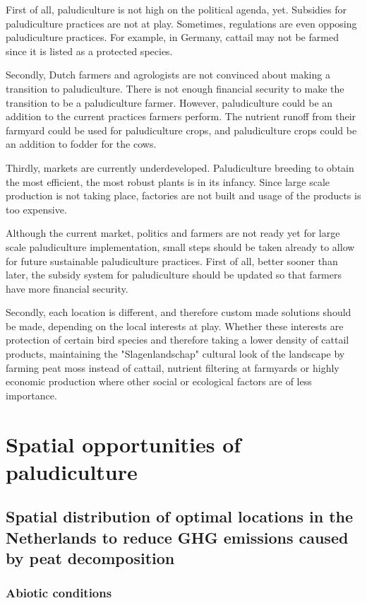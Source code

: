{First of all, paludiculture is not high on the political agenda, yet. Subsidies for paludiculture practices are not at play. Sometimes, regulations are even opposing paludiculture practices. For example, in Germany, cattail may not be farmed since it is listed as a protected species. 

Secondly, Dutch farmers and agrologists are not convinced about making a transition to paludiculture. There is not enough financial security to make the transition to be a paludiculture farmer. However, paludiculture could be an addition to the current practices farmers perform. The nutrient runoff from their farmyard could be used for paludiculture crops, and paludiculture crops could be an addition to fodder for the cows. 

Thirdly, markets are currently underdeveloped. Paludiculture breeding to obtain the most efficient, the most robust plants is in its infancy. Since large scale production is not taking place, factories are not built and usage of the products is too expensive. 

Although the current market, politics and farmers are not ready yet for large scale paludiculture implementation, small steps should be taken already to allow for future sustainable paludiculture practices. First of all, better sooner than later, the subsidy system for paludiculture should be updated so that farmers have more financial security. 

Secondly, each location is different, and therefore custom made solutions should be made, depending on the local interests at play. Whether these interests are protection of certain bird species and therefore taking a lower density of cattail products, maintaining the "Slagenlandschap" cultural look of the landscape by farming peat moss instead of cattail, nutrient filtering at farmyards or highly economic production where other social or ecological factors are of less importance.

\chapter{Spatial opportunities of paludiculture}

\section{Spatial distribution of optimal locations in the Netherlands to reduce GHG emissions caused by peat decomposition}

\subsection{Abiotic conditions}

}
